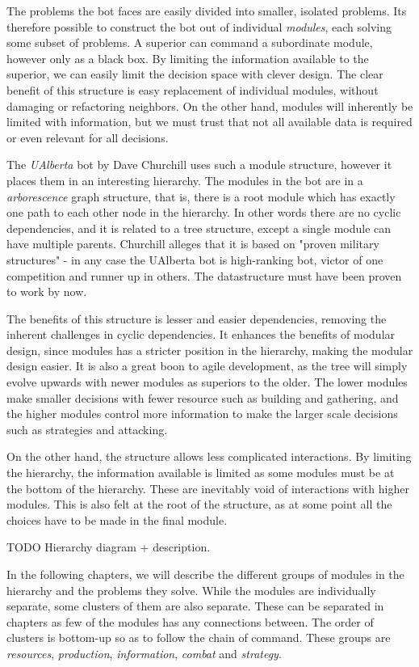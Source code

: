 The problems the bot faces are easily divided into smaller, isolated problems. Its therefore possible to construct the bot out of individual \emph{modules}, each solving some subset of problems. A superior can command a subordinate module, however only as a black box. By limiting the information available to the superior, we can easily limit the decision space with clever design. The clear benefit of this structure is easy replacement of individual modules, without damaging or refactoring neighbors. On the other hand, modules will inherently be limited with information, but we must trust that not all available data is required or even relevant for all decisions.

The \emph{UAlberta} bot by Dave Churchill uses such a module structure, however it places them in an interesting hierarchy. The modules in the bot are in a \emph{arborescence} graph structure, that is, there is a root module which has exactly one path to each other node in the hierarchy. In other words there are no cyclic dependencies, and it is related to a tree structure, except a single module can have multiple parents. Churchill alleges that it is based on "proven military structures" - in any case the UAlberta bot is high-ranking bot, victor of one competition and runner up in others. The datastructure must have been proven to work by now.

The benefits of this structure is lesser and easier dependencies, removing the inherent challenges in cyclic dependencies. It enhances the benefits of modular design, since modules has a stricter position in the hierarchy, making the modular design easier. It is also a great boon to agile development, as the tree will simply evolve upwards with newer modules as superiors to the older. The lower modules make smaller decisions with fewer resource such as building and gathering, and the higher modules control more information to make the larger scale decisions such as strategies and attacking.

On the other hand, the structure allows less complicated interactions. By limiting the hierarchy, the information available is limited as some modules must be at the bottom of the hierarchy. These are inevitably void of interactions with higher modules. This is also felt at the root of the structure, as at some point all the choices have to be made in the final module.

TODO Hierarchy diagram + description.

In the following chapters, we will describe the different groups of modules in the hierarchy and the problems they solve. While the modules are individually separate, some clusters of them are also separate. These can be separated in chapters as few of the modules has any connections between. The order of clusters is bottom-up so as to follow the chain of command. These groups are \emph{resources}, \emph{production}, \emph{information}, \emph{combat} and \emph{strategy}.

